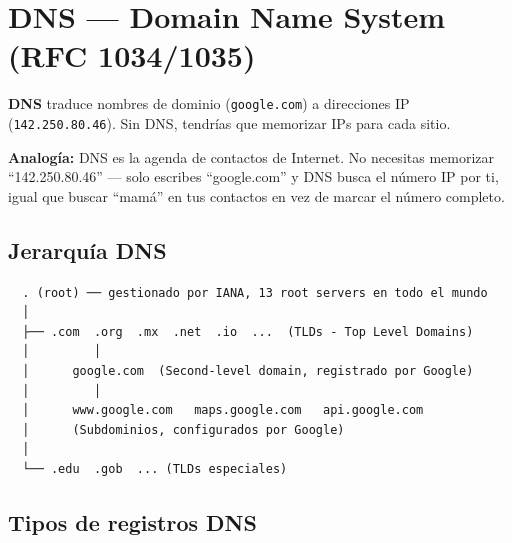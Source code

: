 \section{ DNS --- Domain Name System (RFC 1034/1035)}

\begin{concepto}
\textbf{DNS} traduce nombres de dominio (\texttt{google.com}) a direcciones IP
(\texttt{142.250.80.46}). Sin DNS, tendrías que memorizar IPs para cada sitio.

 \textbf{Analogía:} DNS es la agenda de contactos de Internet.
No necesitas memorizar ``142.250.80.46'' --- solo escribes ``google.com'' y
DNS busca el número IP por ti, igual que buscar ``mamá'' en tus contactos
en vez de marcar el número completo.
\end{concepto}

\subsection{Jerarquía DNS}

\begin{lstlisting}
  . (root) ── gestionado por IANA, 13 root servers en todo el mundo
  │
  ├── .com  .org  .mx  .net  .io  ...  (TLDs - Top Level Domains)
  │         │
  │      google.com  (Second-level domain, registrado por Google)
  │         │
  │      www.google.com   maps.google.com   api.google.com
  │      (Subdominios, configurados por Google)
  │
  └── .edu  .gob  ... (TLDs especiales)
\end{lstlisting}

\subsection{Tipos de registros DNS}


